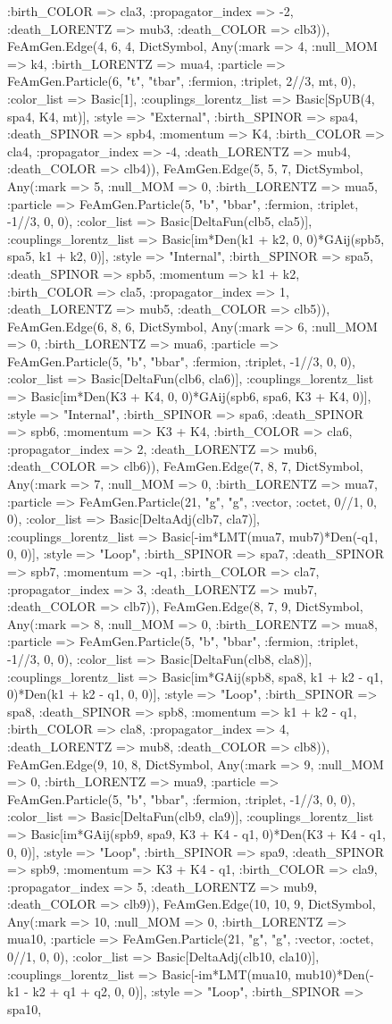 \documentclass{revtex4}
\begin{document}
\begin{figure}[!htb]
\begin{center}
{:birth_COLOR => cla3, :propagator_index => -2, :death_LORENTZ => mub3, :death_COLOR => clb3)), FeAmGen.Edge(4, 6, 4, Dict{Symbol, Any}(:mark => 4, :null_MOM => k4, :birth_LORENTZ => mua4, :particle => FeAmGen.Particle(6, "t", "tbar", :fermion, :triplet, 2//3, mt, 0), :color_list => Basic[1], :couplings_lorentz_list => Basic[SpUB(4, spa4, K4, mt)], :style => "External", :birth_SPINOR => spa4, :death_SPINOR => spb4, :momentum => K4, :birth_COLOR => cla4, :propagator_index => -4, :death_LORENTZ => mub4, :death_COLOR => clb4)), FeAmGen.Edge(5, 5, 7, Dict{Symbol, Any}(:mark => 5, :null_MOM => 0, :birth_LORENTZ => mua5, :particle => FeAmGen.Particle(5, "b", "bbar", :fermion, :triplet, -1//3, 0, 0), :color_list => Basic[DeltaFun(clb5, cla5)], :couplings_lorentz_list => Basic[im*Den(k1 + k2, 0, 0)*GAij(spb5, spa5, k1 + k2, 0)], :style => "Internal", :birth_SPINOR => spa5, :death_SPINOR => spb5, :momentum => k1 + k2, :birth_COLOR => cla5, :propagator_index => 1, :death_LORENTZ => mub5, :death_COLOR => clb5)), FeAmGen.Edge(6, 8, 6, Dict{Symbol, Any}(:mark => 6, :null_MOM => 0, :birth_LORENTZ => mua6, :particle => FeAmGen.Particle(5, "b", "bbar", :fermion, :triplet, -1//3, 0, 0), :color_list => Basic[DeltaFun(clb6, cla6)], :couplings_lorentz_list => Basic[im*Den(K3 + K4, 0, 0)*GAij(spb6, spa6, K3 + K4, 0)], :style => "Internal", :birth_SPINOR => spa6, :death_SPINOR => spb6, :momentum => K3 + K4, :birth_COLOR => cla6, :propagator_index => 2, :death_LORENTZ => mub6, :death_COLOR => clb6)), FeAmGen.Edge(7, 8, 7, Dict{Symbol, Any}(:mark => 7, :null_MOM => 0, :birth_LORENTZ => mua7, :particle => FeAmGen.Particle(21, "g", "g", :vector, :octet, 0//1, 0, 0), :color_list => Basic[DeltaAdj(clb7, cla7)], :couplings_lorentz_list => Basic[-im*LMT(mua7, mub7)*Den(-q1, 0, 0)], :style => "Loop", :birth_SPINOR => spa7, :death_SPINOR => spb7, :momentum => -q1, :birth_COLOR => cla7, :propagator_index => 3, :death_LORENTZ => mub7, :death_COLOR => clb7)), FeAmGen.Edge(8, 7, 9, Dict{Symbol, Any}(:mark => 8, :null_MOM => 0, :birth_LORENTZ => mua8, :particle => FeAmGen.Particle(5, "b", "bbar", :fermion, :triplet, -1//3, 0, 0), :color_list => Basic[DeltaFun(clb8, cla8)], :couplings_lorentz_list => Basic[im*GAij(spb8, spa8, k1 + k2 - q1, 0)*Den(k1 + k2 - q1, 0, 0)], :style => "Loop", :birth_SPINOR => spa8, :death_SPINOR => spb8, :momentum => k1 + k2 - q1, :birth_COLOR => cla8, :propagator_index => 4, :death_LORENTZ => mub8, :death_COLOR => clb8)), FeAmGen.Edge(9, 10, 8, Dict{Symbol, Any}(:mark => 9, :null_MOM => 0, :birth_LORENTZ => mua9, :particle => FeAmGen.Particle(5, "b", "bbar", :fermion, :triplet, -1//3, 0, 0), :color_list => Basic[DeltaFun(clb9, cla9)], :couplings_lorentz_list => Basic[im*GAij(spb9, spa9, K3 + K4 - q1, 0)*Den(K3 + K4 - q1, 0, 0)], :style => "Loop", :birth_SPINOR => spa9, :death_SPINOR => spb9, :momentum => K3 + K4 - q1, :birth_COLOR => cla9, :propagator_index => 5, :death_LORENTZ => mub9, :death_COLOR => clb9)), FeAmGen.Edge(10, 10, 9, Dict{Symbol, Any}(:mark => 10, :null_MOM => 0, :birth_LORENTZ => mua10, :particle => FeAmGen.Particle(21, "g", "g", :vector, :octet, 0//1, 0, 0), :color_list => Basic[DeltaAdj(clb10, cla10)], :couplings_lorentz_list => Basic[-im*LMT(mua10, mub10)*Den(-k1 - k2 + q1 + q2, 0, 0)], :style => "Loop", :birth_SPINOR => spa10, }
\end{center}
\end{figure}
\end{document}

